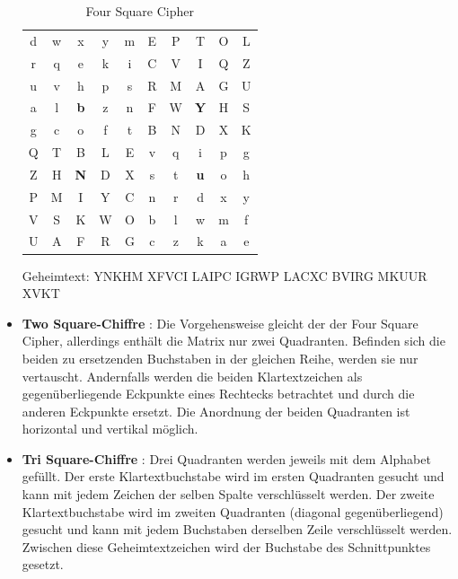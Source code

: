 \begin{refsegment}
\begin{itemize}
   \begin{table}[ht]
   \begin{center}
   \begin{tabular}{|ccccc|ccccc|}
   \hline
	d & w & x & y & m & E & P & T & O & L\\
	r & q & e & k & i & C & V & I & Q & Z\\
	u & v & h & p & s & R & M & A & G & U\\
	a & l & {\bf b} & z & n & F & W & {\bf Y} & H & S\\
	g & c & o & f & t & B & N & D & X & K\\
   \hline
	Q & T & B & L & E & v & q & i & p & g\\
	Z & H & {\bf N} & D & X & s & t & {\bf u} & o & h\\
	P & M & I & Y & C & n & r & d & x & y\\
	V & S & K & W & O & b & l & w & m & f\\
	U & A & F & R & G & c & z & k & a & e\\
   \hline
   \end{tabular}
   \caption{Four Square Cipher}
   \label{Four-Square-Cipher-table-reference}
   \end{center}
   \end{table}

   Geheimtext:  YNKHM XFVCI LAIPC IGRWP LACXC BVIRG MKUUR XVKT\\


\item {\bf Two Square-Chiffre} \cite{Savard1999}:
   Die Vorgehensweise gleicht der der Four Square Cipher, allerdings enthält
   die Matrix nur zwei Quadranten. Befinden sich die beiden zu ersetzenden
   Buchstaben in der gleichen Reihe, werden sie nur vertauscht. Andernfalls
   werden die beiden Klartextzeichen als gegenüberliegende Eckpunkte eines
   Rechtecks betrachtet und durch die anderen Eckpunkte ersetzt. Die Anordnung
   der beiden Quadranten ist horizontal und vertikal möglich.


\item {\bf Tri Square-Chiffre} \cite{ACA2002}:
   Drei Quadranten werden jeweils mit dem Alphabet gefüllt. Der erste
   Klartextbuchstabe wird im ersten Quadranten gesucht und kann mit jedem
   Zeichen der selben Spalte verschlüsselt werden. Der zweite
   Klartextbuchstabe wird im zweiten Quadranten (diagonal gegenüberliegend)
   gesucht und kann mit jedem Buchstaben derselben Zeile verschlüsselt werden.
   Zwischen diese Geheimtextzeichen wird der Buchstabe des Schnittpunktes
   gesetzt.


\end{itemize}
\end{refsegment}
